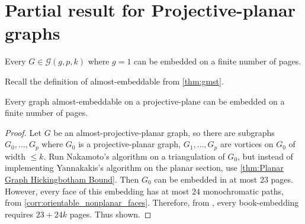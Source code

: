 
\section{Partial result for Projective-planar graphs}

\begin{theorem}
	Every $G \in \mathcal{G}(g, p, k)$ where $g = 1$ can be embedded on a finite number of pages.
\end{theorem}
Recall the definition of almost-embeddable from \cref{thm:gmst}. 
\begin{theorem}
	Every graph almost-embeddable on a projective-plane can be embedded on a finite number of pages. 
\end{theorem}

\begin{proof}
	Let $G$ be an almost-projective-planar graph, so there are subgraphs $G_0, \ldots, G_p$ where $G_0$ is a projective-planar graph, $G_1, \ldots, G_p$ are vortices on $G_0$ of width $\leq k$. 
	Run Nakamoto's algorithm on a triangulation of $G_0$, but instead of implementing Yannakakis's algorithm on the planar section, use \cref{thm:Planar Graph Hickingbotham Bound}. Then $G_0$ can be embedded in at most $23$ pages. However, every face of this embedding has at most $24$ monochromatic paths, from \cref{corr:orientable_nonplanar_faces}. Therefore, from \label{lem:orientablesurfaces_monochromatic_edges}, every book-embedding requires $23 + 24k$ pages. Thus shown. 
\end{proof}